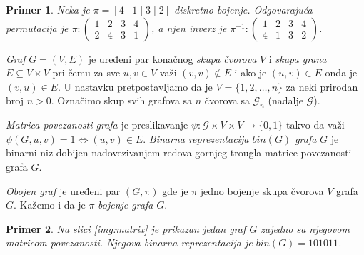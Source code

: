 \documentclass[12pt,oneside]{memoir}
\newtheorem{example}{Primer}
\theoremstyle{definition}
\begin{document}
   \begin{example}
	   Neka je $\pi = [4 \mid 1 \mid 3 \mid 2]$ diskretno bojenje. Odgovarajuća
	   permutacija je $\pi :
	   \begin{pmatrix}
		   1 & 2 & 3 & 4 \\
		   2 & 4 & 3 & 1
	   \end{pmatrix}$,
	   a njen inverz je $\pi^{-1} :
	   \begin{pmatrix}
		   1 & 2 & 3 & 4 \\
		   4 & 1 & 3 & 2
	   \end{pmatrix}$.
   \end{example}

   \emph{Graf} $G = (V, E)$ je uređeni par konačnog \emph{skupa čvorova} $V$ i
   \emph{skupa grana} $E \subseteq V \times V$ pri čemu za sve $u, v \in V$
   važi $(v, v) \notin E$ i ako je $(u, v) \in E$ onda je $(v, u) \in E$. U
   nastavku pretpostavljamo da je $V = \{1, 2, \dots, n\}$ za neki prirodan
   broj $n > 0$. Označimo skup svih grafova sa $n$ čvorova sa $\mathcal{G}_n$
   (nadalje $\mathcal{G}$).

   \emph{Matrica povezanosti grafa} je preslikavanje $\psi : \mathcal{G} \times
   V \times V \to \{0, 1\}$ takvo da važi $\psi(G, u, v) = 1 \iff (u, v) \in
   E$.  \emph{Binarna reprezentacija $bin(G)$ grafa} $G$ je binarni niz dobijen
   nadovezivanjem redova gornjeg trougla matrice povezanosti grafa $G$.

   \emph{Obojen graf} je uređeni par $(G, \pi)$ gde je $\pi$ jedno bojenje
   skupa čvorova $V$ grafa $G$. Kažemo i da je $\pi$ \emph{bojenje grafa} $G$.

   \begin{example}
	   Na slici \ref{img:matrix} je prikazan jedan graf $G$ zajedno sa njegovom
	   matricom povezanosti. Njegova binarna reprezentacija je $bin(G) =
	   101011$.
   \end{example}
\end{document}
